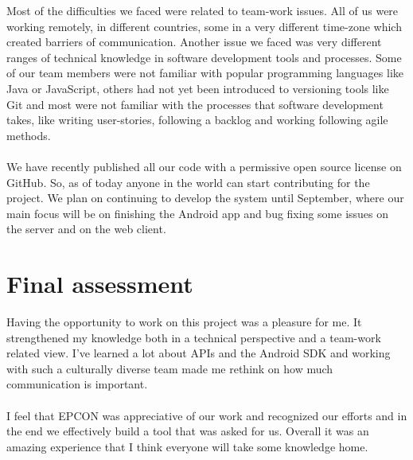Most of the difficulties we faced were related to team-work issues. All of us were working remotely, in different countries, some in a very different time-zone which created barriers of communication. Another issue we faced was very different ranges of technical knowledge in software development tools and processes. Some of our team members were not familiar with popular programming languages like Java or JavaScript, others had not yet been introduced to versioning tools like Git and most were not familiar with the processes that software development takes, like writing user-stories, following a backlog and working following agile methods.
\\ \\
We have recently published all our code with a permissive open source license on GitHub. So, as of today anyone in the world can start contributing for the project. We plan on continuing to develop the system until September, where our main focus will be on finishing the Android app and bug fixing some issues on the server and on the web client.

\section{Final assessment}

Having the opportunity to work on this project was a pleasure for me. It strengthened my knowledge both in a technical perspective and a team-work related view. I've learned a lot about APIs and the Android SDK and working with such a culturally diverse team made me rethink on how much communication is important.
\\ \\
I feel that EPCON was appreciative of our work and recognized our efforts and in the end we effectively build a tool that was asked for us. Overall it was an amazing experience that I think everyone will take some knowledge home.
